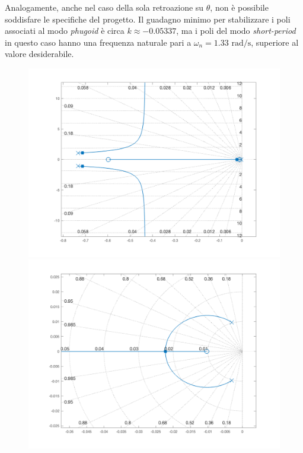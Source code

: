 Analogamente, anche nel caso della sola retroazione su $\theta$, non è possibile soddisfare le specifiche del progetto. Il guadagno minimo per stabilizzare i poli associati al modo \textit{phugoid} è circa $k \approx -0.05337$, ma i poli del modo \textit{short-period} in questo caso hanno una frequenza naturale pari a $\omega_n = 1.33 \text{ rad/s}$, superiore al valore desiderabile.
\begin{figure}[H]
    \centering
    \begin{minipage}{.48\textwidth}
        \centering
        \includegraphics[width=1\linewidth]{Immagini/root_theta_only_1.pdf}
    \end{minipage}
    \hspace{0.02\textwidth}
    \begin{minipage}{.48\textwidth}
        \centering
        \includegraphics[width=1\linewidth]{Immagini/root_theta_only_2.pdf}
    \end{minipage}
\end{figure}

